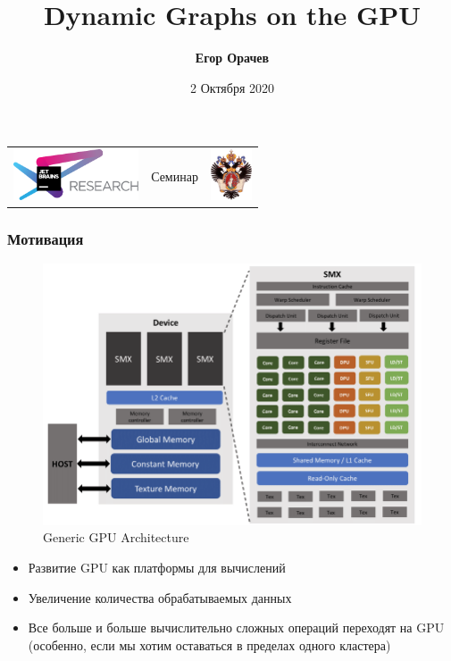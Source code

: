 \documentclass[xcolor=table,english]{beamer}
\title[Dynamic Graphs GPU]{Dynamic Graphs on the GPU}
\institute[СПбГУ]{
JetBrains Research, Лаборатория языковых инструментов  \\
Санкт-Петербургский Государственный университет
}
\author[Егор Орачев]{\textbf{Егор Орачев}}
\date{2 Октября 2020}
\begin{document}
{
\begin{frame}[fragile]
  \begin{table}
  \centering
  \begin{tabularx}{\linewidth}{YcX}
    \includegraphics[height=1.5cm]{pictures/jetbrainsResearch.pdf} \hfill
    & \begin{minipage}[t]{0.3\textwidth}\center \vspace{-1cm}  Семинар
      \end{minipage}
    & \hfill \includegraphics[height=1.5cm]{pictures/SPbGU_Logo.png}
  \end{tabularx}
  \end{table}
  \titlepage
\end{frame}
}

\begin{frame}[fragile] \frametitle{Мотивация} 
    \begin{minipage}[m]{0.45\linewidth}
        \begin{figure}
            \centering
            \includegraphics[width=\textwidth]{pictures/gpu_architecture.png}
            \caption{Generic GPU Architecture}
            \label{fig:architecture}
        \end{figure}
    \end{minipage}\hfill
    \begin{minipage}[m]{0.55\linewidth}
        \begin{itemize}
            \item Развитие GPU как платформы для вычислений
            \item Увеличение количества обрабатываемых данных
            \item Все больше и больше вычислительно сложных операций переходят на GPU 
                  (особенно, если мы хотим оставаться в пределах одного кластера)
        \end{itemize}
    \end{minipage}
\end{frame}
\end{document}
